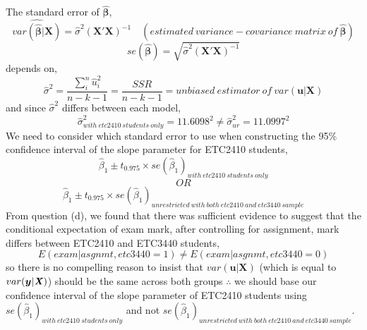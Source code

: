 \documentclass[12pt]{report}
\begin{document}
\noindent The standard error of $\boldsymbol{\hat{\beta}}$,
$$\widehat{var({\boldsymbol{\hat{\beta}}|\boldsymbol{X}})} = \hat{\sigma}^2(\boldsymbol{X'X})^{-1} \quad (estimated\ variance-covariance\ matrix\ of\ \boldsymbol{\hat{\beta}})$$
$$se(\boldsymbol{\hat{\beta}}) = \sqrt{\hat{\sigma}^2(\boldsymbol{X'X})^{-1}}$$
\noindent depends on,
$$\hat{\sigma}^2 = \dfrac{\sum_{i}^{n}\hat{u}_{i}^{2}}{n-k-1} = \dfrac{SSR}{n-k-1} = unbiased\ estimator\ of\ var(\boldsymbol{u}|\boldsymbol{X})$$
and since $\hat{\sigma}^2$ differs between each model,
$$\hat{\sigma}^2_{with\ etc2410\ students\ only} = 11.6098^2 \neq \hat{\sigma}^2_{ur} = 11.0997^2$$
\noindent We need to consider which standard error to use when constructing the 95\% confidence interval of the slope parameter for ETC2410 students,
$$\hat{\beta}_1 \pm t_{0.975} \times se(\hat{\beta}_1)_{with\ etc2410\ students\ only}$$
$$OR$$
$$\hat{\beta}_1 \pm t_{0.975} \times se(\hat{\beta}_1)_{unrestricted\ with\ both\ etc2410\ and\ etc3440\ sample}$$
\noindent From question (d), we found that there was sufficient evidence to suggest that the conditional expectation of exam mark, after controlling for assignment, mark differs between ETC2410 and ETC3440 students, $$E(exam|asgnmt, etc3440=1) \neq E(exam|asgnmt, etc3440=0) $$ so there is no compelling reason to insist that $var(\boldsymbol{u}|\boldsymbol{X})$ (which is equal to $var(\boldsymbol{y}|\textbf{\textit{X}})$) should be the same across both groups $\therefore$ we should base our confidence interval of the slope parameter of ETC2410 students using $se(\hat{\beta}_1)_{with\ etc2410\ students\ only}$ and not $se(\hat{\beta}_1)_{unrestricted\ with\ both\ etc2410\ and\ etc3440\ sample}$.
\end{document}
